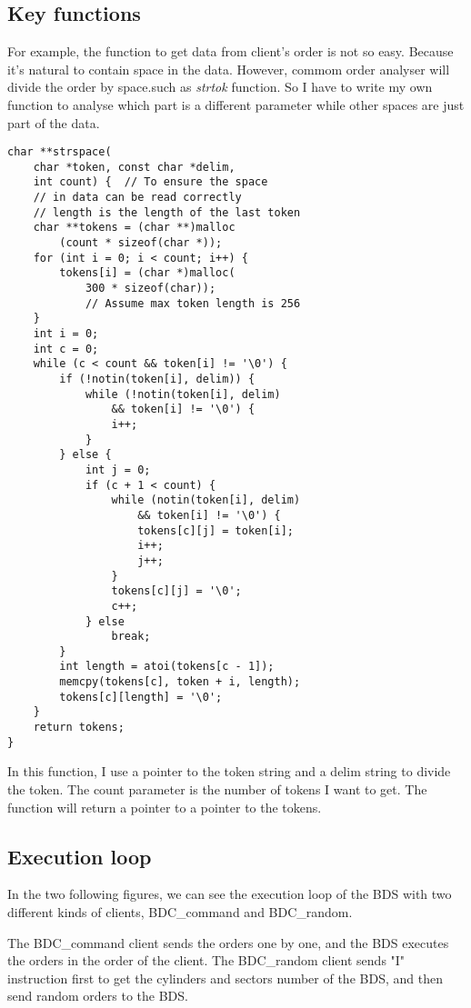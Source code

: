 \documentclass[a4paper]{article}
\begin{document}
\subsection{Key functions}

For example, the function to get data from client's order is not so easy. Because it's natural to contain space in the data. However, commom order analyser will divide the order by space.such as \textit{strtok} function. So I have to write my own function to analyse which part is a different parameter while other spaces are just part of the data. 

\begin{lstlisting}
char **strspace(
    char *token, const char *delim,
    int count) {  // To ensure the space 
    // in data can be read correctly
    // length is the length of the last token
    char **tokens = (char **)malloc
        (count * sizeof(char *));
    for (int i = 0; i < count; i++) {
        tokens[i] = (char *)malloc(
            300 * sizeof(char));  
            // Assume max token length is 256
    }
    int i = 0;
    int c = 0;
    while (c < count && token[i] != '\0') {
        if (!notin(token[i], delim)) {
            while (!notin(token[i], delim) 
                && token[i] != '\0') {
                i++;
            }
        } else {
            int j = 0;
            if (c + 1 < count) {
                while (notin(token[i], delim) 
                    && token[i] != '\0') {
                    tokens[c][j] = token[i];
                    i++;
                    j++;
                }
                tokens[c][j] = '\0';
                c++;
            } else
                break;
        }
        int length = atoi(tokens[c - 1]);
        memcpy(tokens[c], token + i, length);
        tokens[c][length] = '\0';
    }
    return tokens;
}
\end{lstlisting}

In this function, I use a pointer to the token string and a delim string to divide the token. The count parameter is the number of tokens I want to get. The function will return a pointer to a pointer to the tokens.

\subsection{Execution loop}
In the two following figures, we can see the execution loop of the BDS with two different kinds of clients,  BDC\_command and BDC\_random.

The BDC\_command client sends the orders one by one, and the BDS executes the orders in the order of the client. The BDC\_random client sends "I" instruction first to get the cylinders and sectors number of the BDS, and then send random orders to the BDS. 
\end{document}
